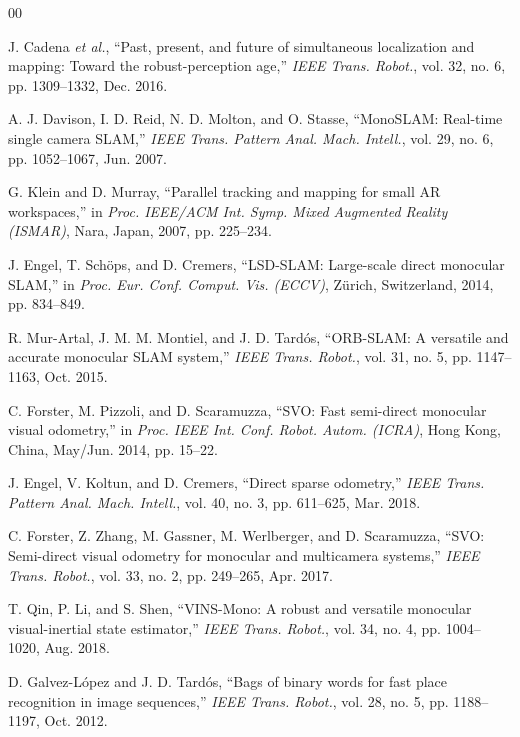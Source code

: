 \documentclass[letterpaper,journal]{IEEEtran}
\begin{document}
\begin{thebibliography}{00}

 J. Cadena \emph{et al.}, ``Past, present, and future of simultaneous localization and mapping: Toward the robust-perception age,'' \emph{IEEE Trans. Robot.}, vol. 32, no. 6, pp. 1309--1332, Dec. 2016.

 A. J. Davison, I. D. Reid, N. D. Molton, and O. Stasse, ``MonoSLAM: Real-time single camera SLAM,'' \emph{IEEE Trans. Pattern Anal. Mach. Intell.}, vol. 29, no. 6, pp. 1052--1067, Jun. 2007.

 G. Klein and D. Murray, ``Parallel tracking and mapping for small AR workspaces,'' in \emph{Proc. IEEE/ACM Int. Symp. Mixed Augmented Reality (ISMAR)}, Nara, Japan, 2007, pp. 225--234.

 J. Engel, T. Sch\"ops, and D. Cremers, ``LSD-SLAM: Large-scale direct monocular SLAM,'' in \emph{Proc. Eur. Conf. Comput. Vis. (ECCV)}, Z\"urich, Switzerland, 2014, pp. 834--849.

 R. Mur-Artal, J. M. M. Montiel, and J. D. Tard\'os, ``ORB-SLAM: A versatile and accurate monocular SLAM system,'' \emph{IEEE Trans. Robot.}, vol. 31, no. 5, pp. 1147--1163, Oct. 2015.

 C. Forster, M. Pizzoli, and D. Scaramuzza, ``SVO: Fast semi-direct monocular visual odometry,'' in \emph{Proc. IEEE Int. Conf. Robot. Autom. (ICRA)}, Hong Kong, China, May/Jun. 2014, pp. 15--22.

 J. Engel, V. Koltun, and D. Cremers, ``Direct sparse odometry,'' \emph{IEEE Trans. Pattern Anal. Mach. Intell.}, vol. 40, no. 3, pp. 611--625, Mar. 2018.

 C. Forster, Z. Zhang, M. Gassner, M. Werlberger, and D. Scaramuzza, ``SVO: Semi-direct visual odometry for monocular and multicamera systems,'' \emph{IEEE Trans. Robot.}, vol. 33, no. 2, pp. 249--265, Apr. 2017.

 T. Qin, P. Li, and S. Shen, ``VINS-Mono: A robust and versatile monocular visual-inertial state estimator,'' \emph{IEEE Trans. Robot.}, vol. 34, no. 4, pp. 1004--1020, Aug. 2018.

 D. Galvez-L\'opez and J. D. Tard\'os, ``Bags of binary words for fast place recognition in image sequences,'' \emph{IEEE Trans. Robot.}, vol. 28, no. 5, pp. 1188--1197, Oct. 2012.


\end{thebibliography}
\end{document}
